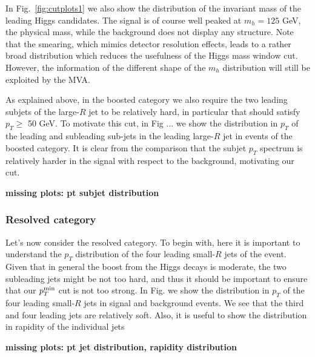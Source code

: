 In Fig.~\ref{fig:cutplots1} we also show the distribution
of the invariant mass of the leading Higgs candidates.
%
The signal is of course well peaked at $m_h=125$ GeV, the physical
mass, while the background does not display any structure.
%
Note that the smearing, which mimics detector resolution effects,
leads to a rather broad distribution which reduces the usefulness
of the Higgs mass window cut.
%
However, the information of the different shape of the $m_{h}$
distribution will still be exploited by the MVA.

As explained above, in the boosted category we also require the two
leading subjets of the large-$R$ jet to be relatively
hard, in particular that should satisfy $p_T \ge $ 50 GeV.
%
To motivate this cut, in Fig ... we show the distribution in $p_T$ of the leading
and subleading sub-jets in the leading large-$R$ jet in events
of the boosted category.
%
It is clear from the comparison that the subjet $p_T$ spectrum is
relatively harder in the signal with respect to the background,
motivating our cut.

{\bf missing plots: pt subjet distribution}




\subsubsection{Resolved category}


Let's now consider the resolved category.
%
To begin with, here it is important to understand the $p_T$ distribution
of the four leading small-$R$ jets of the event.
%
Given that in general the boost from the Higgs decays is moderate,
the two subleading jets might be not too hard, and thus it
should be important to ensure that our $p_T^{\rm min}$ cut
is not too strong.
%
In Fig. we show the distribution in $p_T$ of the four leading
small-$R$ jets in signal and background events.
%
We see that the third and four leading jets are relatively soft.
%
Also, it is useful to show the distribution in rapidity of the
individual jets

{\bf missing plots: pt jet distribution, rapidity distribution}


